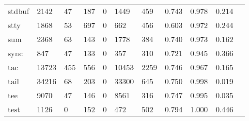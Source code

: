 \begin{longtable}{lp{1.10cm}p{1.10cm}p{1.10cm}p{1.10cm}p{1.10cm}p{1.10cm}p{1.10cm}p{1.10cm}p{1.10cm}p{1.10cm}}
stdbuf    &                   2142 &                                 47 &                               187 &                                0 &                              1449 &                             459 &                             0.743 &                                 0.978 &                               0.214 \\
stty      &                   1868 &                                 53 &                               697 &                                0 &                               662 &                             456 &                             0.603 &                                 0.972 &                               0.244 \\
sum       &                   2368 &                                 63 &                               143 &                                0 &                              1778 &                             384 &                             0.740 &                                 0.973 &                               0.162 \\
sync      &                    847 &                                 47 &                               133 &                                0 &                               357 &                             310 &                             0.721 &                                 0.945 &                               0.366 \\
tac       &                  13723 &                                455 &                               556 &                                0 &                             10453 &                            2259 &                             0.746 &                                 0.967 &                               0.165 \\
tail      &                  34216 &                                 68 &                               203 &                                0 &                             33300 &                             645 &                             0.750 &                                 0.998 &                               0.019 \\
tee       &                   9070 &                                 47 &                               146 &                                0 &                              8561 &                             316 &                             0.747 &                                 0.995 &                               0.035 \\
test      &                   1126 &                                  0 &                               152 &                                0 &                               472 &                             502 &                             0.794 &                                 1.000 &                               0.446 \\

\end{longtable}
